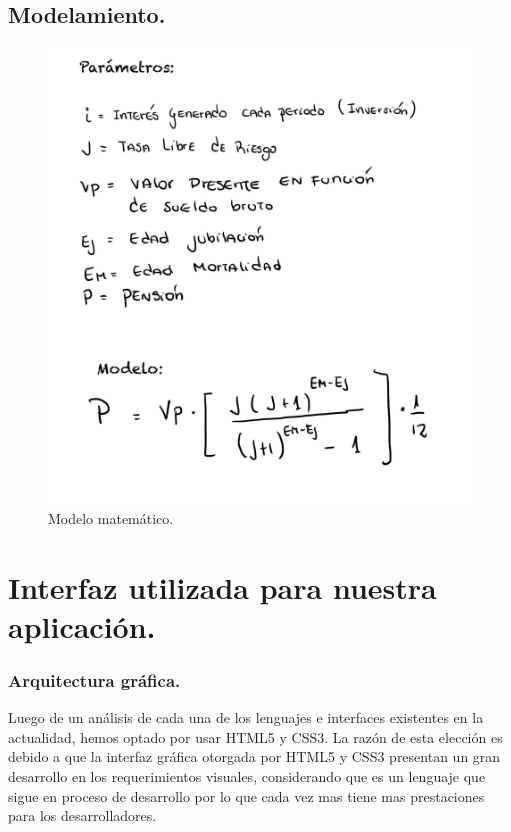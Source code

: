 \documentclass{udpreport}
\begin{document}
\section{Modelamiento.}
\begin{figure}[H]
    \centering
    \includegraphics [scale=0.2]{images/modelo1.jpg}
    \caption{Modelo matemático.}
    
\end{figure}
\chapter{Interfaz utilizada para nuestra aplicación.}
\subsection{Arquitectura gráfica.}
Luego de un análisis de cada una de los lenguajes e interfaces existentes en la actualidad, hemos optado por usar HTML5 y CSS3. La razón de esta elección es debido a que la interfaz gráfica otorgada por HTML5 y CSS3  presentan un gran desarrollo en los requerimientos visuales, considerando que es un lenguaje que sigue en proceso de desarrollo por lo que cada vez mas tiene mas prestaciones para los desarrolladores.
\end{document}
